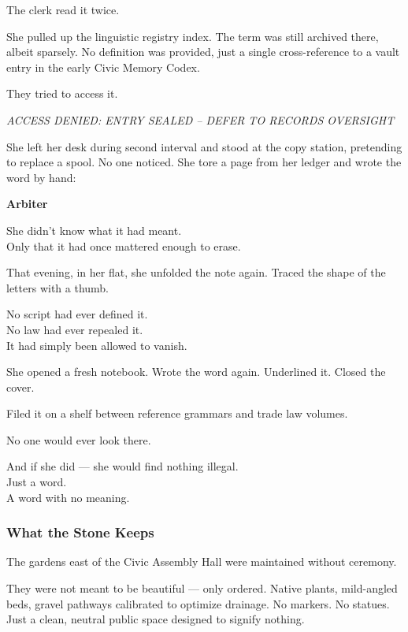 \documentclass[12pt]{article}
\begin{document}
The clerk read it twice.

She pulled up the linguistic registry index. The term was still archived there, albeit sparsely. No definition was provided, just a single cross-reference to a vault entry in the early Civic Memory Codex.

They tried to access it.

\textit{ACCESS DENIED: ENTRY SEALED – DEFER TO RECORDS OVERSIGHT}

\vspace{1em}

She left her desk during second interval and stood at the copy station, pretending to replace a spool. No one noticed. She tore a page from her ledger and wrote the word by hand:

\begin{center}
\textbf{Arbiter}
\end{center}

She didn’t know what it had meant.\\
Only that it had once mattered enough to erase.

\vspace{1em}

That evening, in her flat, she unfolded the note again. Traced the shape of the letters with a thumb.

No script had ever defined it.\\
No law had ever repealed it.\\
It had simply been allowed to vanish.

She opened a fresh notebook. Wrote the word again. Underlined it. Closed the cover.

Filed it on a shelf between reference grammars and trade law volumes.

No one would ever look there.

And if she did --- she would find nothing illegal.\\
Just a word.\\
A word with no meaning.


\dotfill

\subsubsection*{What the Stone Keeps}

The gardens east of the Civic Assembly Hall were maintained without ceremony.

They were not meant to be beautiful --- only ordered. Native plants, mild-angled beds, gravel pathways calibrated to optimize drainage. No markers. No statues. Just a clean, neutral public space designed to signify nothing.
\end{document}

